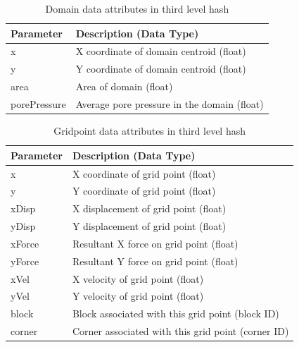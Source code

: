 \begin{table}[!htb]
\centering
\caption{Domain data attributes in third level hash}
\label{tab:keys4}
\begin{tabularx}{\textwidth}{@{}Yp{0.75\textwidth}@{}}
\toprule
\textbf{Parameter} & \textbf{Description (Data Type)}            \\ \midrule
x       & X coordinate of domain centroid (float)     \\
y       & Y coordinate of domain centroid (float)     \\
area               & Area of domain (float)                      \\
porePressure      & Average pore pressure in the domain (float)\\ \bottomrule
\end{tabularx}
\end{table}

\begin{table}[!htb]
\centering
\caption{Gridpoint data attributes in third level hash}
\label{tab:keys5}
\begin{tabularx}{\textwidth}{@{}Yp{0.75\textwidth}@{}}
\toprule
\textbf{Parameter} & \textbf{Description (Data Type)}                             \\ \midrule
x       & X coordinate of grid point (float)                           \\
y       & Y coordinate of grid point (float)                           \\
xDisp     & X displacement of grid point (float)                         \\
yDisp     & Y displacement of grid point (float)                         \\
xForce            & Resultant X force on grid point (float)                      \\
yForce            & Resultant Y force on grid point (float)                      \\
xVel         & X velocity of grid point (float)                             \\
yVel         & Y velocity of grid point (float)                             \\
block              & Block associated with this grid point (block ID)   \\
corner             & Corner associated with this grid point (corner ID)\\ \bottomrule
\end{tabularx}
\end{table}

